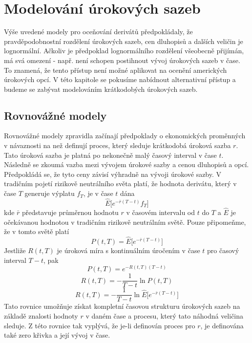 \documentclass[a4paper]{book}
\begin{document}
\chapter{Modelování úrokových sazeb}

Výše uvedené modely pro oceňování derivátů předpokládaly, že pravděpodobnostní rozdělení úrokových sazeb, cen dluhopisů a dalších veličin je lognormální. Ačkoliv je předpoklad lognormálního rozdělení všeobecně přijímán, má svá omezení - např. není schopen postihnout vývoj úrokových sazeb v čase. To znamená, že tento přístup není možné aplikovat na ocenění amerických úrokových opcí. V této kapitole se pokusíme nabídnout alternativní přístup a budeme se zabývat modelováním krátkodobých úrokových sazeb.

\section{Rovnovážné modely}

Rovnovážné modely zpravidla začínají předpoklady o ekonomických proměnných v návaznosti na než definují proces, který sleduje krátkodobá úroková sazba $r$. Tato úroková sazba je platná po nekonečně malý časový interval v čase $t$. Následně se zkoumá vazba mezi vývojem úrokové sazby a cenou dluhopisů a opcí. Předpokládá se, že tyto ceny závisí výhradně na vývoji úrokové sazby. V tradičním pojetí rizikově neutrálního světa platí, že hodnota derivátu, který v čase $T$ generuje výplatu $f_T$, je v čase $t$ dána
\begin{equation*}
\hat{E} \bigg[ e^{-\bar{r}(T-t)}f_T\bigg]
\end{equation*}
kde $\bar{r}$ představuje průměrnou hodnotu $r$ v časovém intervalu od $t$ do $T$ a $\hat{E}$ je očekávanou hodnotou v tradičním rizikově neutrálním světě. Pouze připomeňme, že v tomto světě platí
\begin{equation*}
P(t,T)=\hat{E}\bigg[ e^{-\bar{r}(T-t)}\bigg]
\end{equation*}
Jestliže $R(t,T)$ je úroková míra s kontinuálním úročením v čase $t$ pro časový interval $T - t$, pak
\begin{equation*}
P(t,T) = e^{-R(t,T)(T-t)}
\end{equation*}
\begin{equation}
R(t,T)=-\frac{1}{T-t}\ln P(t,T)
\end{equation}
\begin{equation*}
R(t,T)=-\frac{1}{T-t}\ln \hat{E}\bigg[ e^{-\bar{r}(T-t)}\bigg]
\end{equation*}
Tato rovnice umožňuje získat kompletní časovou strukturu úrokových sazeb na základě znalosti hodnoty $r$ v daném čase a procesu, který tato náhodná veličina sleduje. Z této rovnice tak vyplývá, že je-li definován proces pro $r$, je definována také zero křivka a její vývoj v čase.
\end{document}
